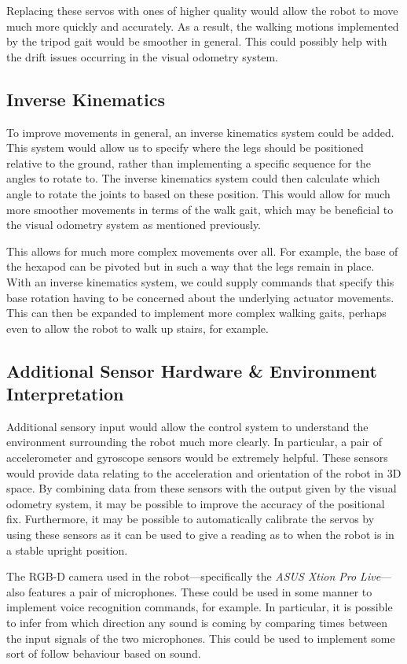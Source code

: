 Replacing these servos with ones of higher quality would allow the robot to move much more quickly and accurately. As a result, the walking motions implemented by the tripod gait would be smoother in general. This could possibly help with the drift issues occurring in the visual odometry system.

\subsection{Inverse Kinematics}
To improve movements in general, an inverse kinematics system could be added. This system would allow us to specify where the legs should be positioned relative to the ground, rather than implementing a specific sequence for the angles to rotate to. The inverse kinematics system could then calculate which angle to rotate the joints to based on these position. This would allow for much more smoother movements in terms of the walk gait, which may be beneficial to the visual odometry system as mentioned previously.

This allows for much more complex movements over all. For example, the base of the hexapod can be pivoted but in such a way that the legs remain in place. With an inverse kinematics system, we could supply commands that specify this base rotation having to be concerned about the underlying actuator movements. This can then be expanded to implement more complex walking gaits, perhaps even to allow the robot to walk up stairs, for example.

\subsection{Additional Sensor Hardware \& Environment Interpretation}
Additional sensory input would allow the control system to understand the environment surrounding the robot much more clearly. In particular, a pair of accelerometer and gyroscope sensors would be extremely helpful. These sensors would provide data relating to the acceleration and orientation of the robot in 3D space. By combining data from these sensors with the output given by the visual odometry system, it may be possible to improve the accuracy of the positional fix. Furthermore, it may be possible to automatically calibrate the servos by using these sensors as it can be used to give a reading as to when the robot is in a stable upright position.

The RGB-D camera used in the robot---specifically the \emph{ASUS Xtion Pro Live}---also features a pair of microphones. These could be used in some manner to implement voice recognition commands, for example. In particular, it is possible to infer from which direction any sound is coming by comparing times between the input signals of the two microphones. This could be used to implement some sort of follow behaviour based on sound.

